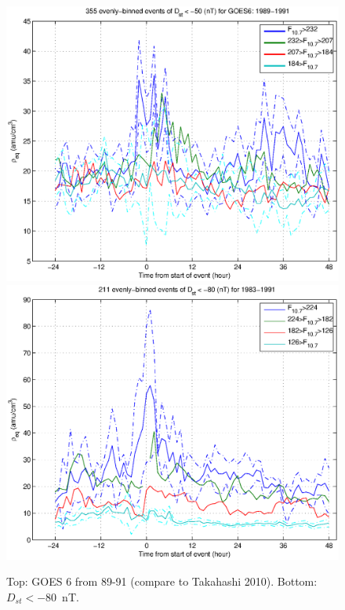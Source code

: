 \documentclass[10pt,twocolumn]{article}
\begin{document}
\begin{figure}[htp!]
\includegraphics[scale=0.45]{paperfigures/HighLowF107rhoeq-Dst50-GOES6-1989-1991.eps}
\includegraphics[scale=0.45]{paperfigures/HighLowF107rhoeq-Dst80.eps}
\caption{Top: GOES 6 from 89-91 (compare to Takahashi 2010). Bottom:  $D_{st}<-80$~nT.}
\end{figure}
\end{document}
